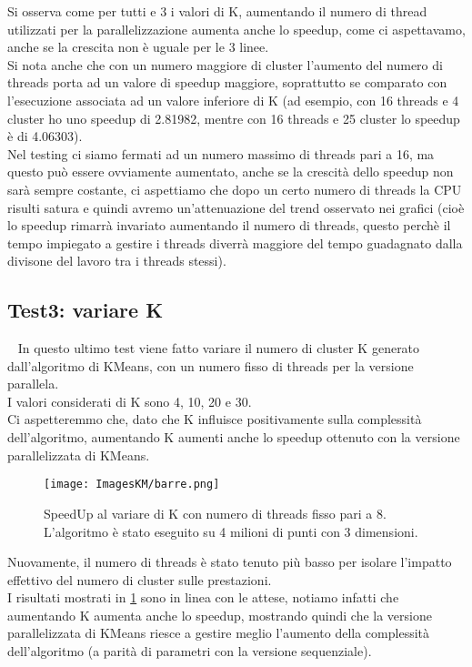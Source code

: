 \documentclass[10pt,twocolumn,letterpaper]{article}
\begin{document}
Si osserva come per tutti e 3 i valori di K, aumentando il numero di thread utilizzati per la parallelizzazione aumenta anche lo speedup, come ci aspettavamo, anche se la crescita non è uguale per le 3 linee.\\
Si nota anche che con un numero maggiore di cluster l'aumento del numero di threads porta ad un valore di speedup maggiore, soprattutto se comparato con l'esecuzione associata ad un valore inferiore di K (ad esempio, con 16 threads e 4 cluster ho uno speedup di 2.81982, mentre con 16 threads e 25 cluster lo speedup è di 4.06303).\\
Nel testing ci siamo fermati ad un numero massimo di threads pari a 16, ma questo può essere ovviamente aumentato, anche se la crescità dello speedup non sarà sempre costante, ci aspettiamo che dopo un certo numero di threads la CPU risulti satura e quindi avremo un'attenuazione del trend osservato nei grafici (cioè lo speedup rimarrà invariato aumentando il numero di threads, questo perchè il tempo impiegato a gestire i threads diverrà maggiore del tempo guadagnato dalla divisone del lavoro tra i threads stessi). 

\subsection{Test3: variare K}\
\label{sec:t3}
In questo ultimo test viene fatto variare il numero di cluster K generato dall'algoritmo di KMeans, con un numero fisso di threads per la versione parallela.\\
I valori considerati di K sono 4, 10, 20 e 30.\\
Ci aspetteremmo che, dato che K influisce positivamente sulla complessità dell'algoritmo, aumentando K aumenti anche lo speedup ottenuto con la versione parallelizzata di KMeans.

\begin{figure}[h]
    \centering
    \texttt{[image: ImagesKM/barre.png]}
    \caption{SpeedUp al variare di K con numero di threads fisso pari a 8. L'algoritmo è stato eseguito su 4 milioni di punti con 3 dimensioni.}
    \label{fig:t3}
\end{figure}

Nuovamente, il numero di threads è stato tenuto più basso per isolare l'impatto effettivo del numero di cluster sulle prestazioni.\\
I risultati mostrati in \cref{fig:t3} sono in linea con le attese, notiamo infatti che aumentando K aumenta anche lo speedup, mostrando quindi che la versione parallelizzata di KMeans riesce a gestire meglio l'aumento della complessità dell'algoritmo (a parità di parametri con la versione sequenziale).
\end{document}
